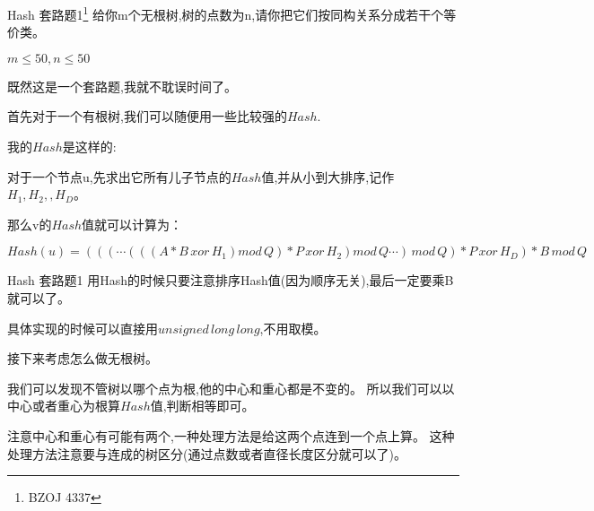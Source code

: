 \documentclass[10pt]{beamer}
\begin{document}
	\begin{frame}{Hash 套路题1\footnote{BZOJ 4337}}
		给你m个无根树,树的点数为n,请你把它们按同构关系分成若干个等价类。

		$m \leq 50 , n \leq 50$

		\vspace{3ex}

		既然这是一个套路题,我就不耽误时间了。\pause

		\vspace{3ex}

		首先对于一个有根树,我们可以随便用一些比较强的$Hash$.
		
		我的$Hash$是这样的:

		对于一个节点u,先求出它所有儿子节点的$Hash$值,并从小到大排序,记作$H_1,H_2, ,H_D$。
		
		那么v的$Hash$值就可以计算为：

		$Hash(u)=(((\cdots(((A*B \, xor \, H_1)mod \, Q)*P\,xor\, H_2)mod\, Q \cdots )\,mod\,Q)*P\, xor\, H_D)*B\, mod \,Q$
	\end{frame}
	\begin{frame}{Hash 套路题1}
		用Hash的时候只要注意排序Hash值(因为顺序无关),最后一定要乘B就可以了。

		具体实现的时候可以直接用$unsigned\,long\,long$,不用取模。

		\vspace{2ex}

		接下来考虑怎么做无根树。\pause

		我们可以发现不管树以哪个点为根,他的中心和重心都是不变的。
		所以我们可以以中心或者重心为根算$Hash$值,判断相等即可。\pause

		注意中心和重心有可能有两个,一种处理方法是给这两个点连到一个点上算。
		这种处理方法注意要与连成的树区分(通过点数或者直径长度区分就可以了)。
	\end{frame}
	
\end{document}
